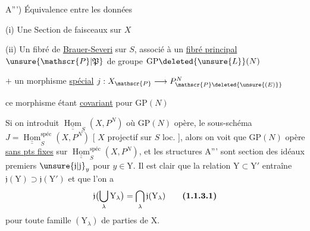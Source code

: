A''') Équivalence entre les données 

(i) Une Section  de faisceaux  sur $X$

(ii) Un fibré de \uline{Brauer-Severi}  sur $S$, associé à un \uline{fibré principal} $\unsure{\mathscr{P}|\mathfrak{P}}$ de groupe $\mathrm{GP}\deleted{\unsure{L}}(N)$

$+$ un morphisme \uline{spécial} $j:X_{\mathscr{P}}\longrightarrow P^{N}_{\mathscr{P}\deleted{\unsure{(E)}}}$


ce morphisme étant \uline{covariant} pour $\mathrm{GP}(N)$

Si on introduit  $\underline{\underline{\operatorname{Hom}}}_{S}(X,P^{N})$ où $\mathrm{GP}(N)$ opère, le sous-schéma  $J=\underline{\underline{\operatorname{Hom}}}_{S}^{\mathrm{spéc}}(X,P^N)$ [ $X$  projectif sur $S$ loc. ], alors  on voit que $\mathrm{GP}(N)$ opère \uline{sans pts fixes} sur $\underline{\underline{\operatorname{Hom}}}_{S}^{\mathrm{spéc}}(X,P^{N})$, et les structures A''' sont
\begingroup
\makeatletter
\tagsleft@true
\makeatother
section des idéaux premiers $\unsure{\mathfrak{j}|\mathrm{j}}_y$ pour $y\in \mathrm{Y}$. Il est clair que la relation $\mathrm{Y}\subset \mathrm{Y}'$ entraîne $\mathfrak{j}(\mathrm{Y})\supset\mathfrak{j}(\mathrm{Y}')$ et que l’on a
\[
\mathfrak{j}\bigl(\bigcup_{\lambda}\mathrm{Y}_{\lambda}\bigr)=\bigcap_{\lambda}\mathfrak{j}(\mathrm{Y}_{\lambda})
\tag*{\textbf{(1.1.3.1)}}
\]
pour toute famille $(\mathrm{Y}_{\lambda})$ de parties de $\mathrm{X}$.  

